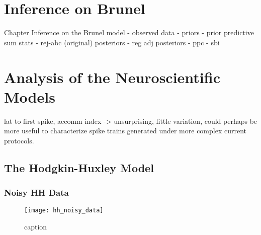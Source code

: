 
\chapter{Inference on Brunel}\label{chap:res_brunel}

Chapter Inference on the Brunel model
- observed data 
- priors
- prior predictive sum stats 
- rej-abc (original) posteriors 
- reg adj posteriors
- ppc 
- sbi



\chapter{Analysis of the Neuroscientific Models}

lat to first spike, accomm index -> unsurprising, little variation, could perhaps be more useful to characterize spike trains generated under more complex current protocols. 


\section{The Hodgkin-Huxley Model}




\subsection{Noisy HH Data}

\begin{figure}[H]
    \centering
    \texttt{[image: hh\_noisy\_data]}
    \caption{caption}
    \label{fig:fig1}
\end{figure} 


